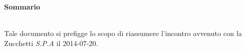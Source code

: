 \noindent\begin{Large}\textbf{Sommario}\end{Large}\\
\noindent Tale documento si prefigge lo scopo di riassumere l'incontro avvenuto con la Zucchetti \textit{S.P.A} il 2014-07-20.\\


